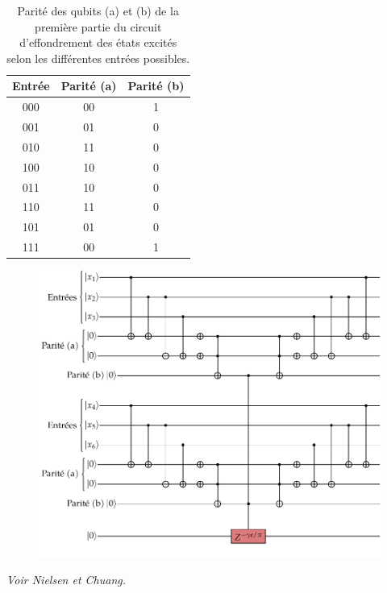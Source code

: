 \begin{table}[h]
    \centering
    \begin{tabular}{c c c}
        \hline
        Entrée & Parité (a) & Parité (b) \\
        \hline
        000 & 00 & 1 \\
        001 & 01 & 0 \\
        010 & 11 & 0 \\
        100 & 10 & 0 \\
        011 & 10 & 0 \\
        110 & 11 & 0 \\
        101 & 01 & 0 \\
        111 & 00 & 1 \\
        \hline
    \end{tabular}
    \caption{Parité des qubits (a) et (b) de la première partie du circuit d'effondrement des états excités selon les différentes entrées possibles.}
    \label{tab:tower-excited-states-parity}
\end{table}

\begin{figure}[h]
    \centering
    \includegraphics[width=1\textwidth]{figures/tower-excited-states-circuit.pdf}
    \caption[Circuit d'effondrement des états excités]{}
    \label{fig:tower-excited-states-circuit}
\end{figure}

\textcolor{mydarkred}{\textit{Voir Nielsen et Chuang.}}
